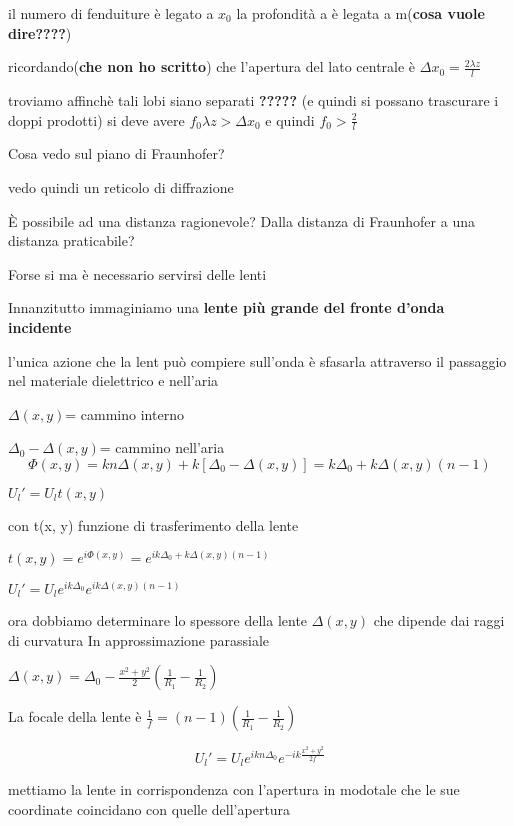 \documentclass{article}
\begin{document}
il numero di fenduiture è legato a $x_{0}$ la profondità a è legata a m(\textbf{cosa vuole dire????})

ricordando(\textbf{che non ho scritto}) che l'apertura del lato centrale è 
$\Delta x_{0}= \frac{2 \lambda z}{l}$ 

troviamo affinchè tali lobi siano separati \textbf{?????}  (e quindi si possano trascurare i doppi prodotti) si deve avere $f_{0} \lambda z >\Delta x_{0} $ e quindi $f_{0}>\frac{2}{l}$

Cosa vedo sul piano di Fraunhofer?

vedo quindi un reticolo di diffrazione 

È possibile ad una distanza ragionevole? Dalla distanza di Fraunhofer a una distanza praticabile?

Forse si ma è necessario servirsi delle lenti

Innanzitutto immaginiamo una \textbf{lente più grande del fronte d'onda incidente}

l'unica azione che la lent può compiere sull'onda è sfasarla attraverso il passaggio nel materiale dielettrico e nell'aria

$\Delta (x, y) $= cammino interno

$\Delta_{0} - \Delta (x, y) $= cammino nell'aria
\begin{equation}
\Phi (x, y) = k n \Delta (x, y) + k [\Delta_{0} - \Delta (x, y)] = k \Delta_{0} + k \Delta (x,y) (n-1)
\end{equation}

$U_{l}'=U_{l} t(x,y) $

con t(x, y) funzione di trasferimento della lente 

$t(x,y) = e^{i \Phi (x,y)} = e^{i k \Delta_{0} + k \Delta (x,y) (n-1)}$

$U_{l}'=U_{l} e^{i k \Delta_{0}} e^{i k \Delta (x,y) (n-1)} $

ora dobbiamo determinare lo spessore della lente $\Delta (x,y)$ che dipende dai raggi di curvatura In approssimazione parassiale

$\Delta(x,y) = \Delta_{0} - \frac{x^{2}+ y^{2}}{2}  (\frac{1}{R_{1}} -\frac{1}{R_{2}} )$

La focale della lente è 
$\frac{1}{f} = (n-1)(\frac{1}{R_{1}} -\frac{1}{R_{2}} )$

\begin{equation}
U_{l}'=U_{l} e^{i k n \Delta_{0}} e^{- i k \frac{x^{2}+ y^{2}}{2 f} } 
\end{equation}

mettiamo la lente in corrispondenza con l'apertura in modotale che le sue coordinate coincidano con quelle dell'apertura 
\end{document}
